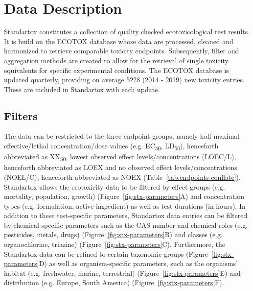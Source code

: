 \documentclass[journal,datadescriptor,submit,moreauthors,pdftex]{Definitions/mdpi}
\begin{document}
\section{Data Description}
Standartox constitutes a collection of quality checked ecotoxicological test results. It is build on the ECOTOX database \citep{usepa_ecotox_2019} whose data are processed, cleaned and harmonized to retrieve comparable toxicity endpoints. Subsequently, filter and aggregation methods are created to allow for the retrieval of single toxicity equivalents for specific experimental conditions. The ECOTOX database is updated quarterly, providing on average 5228 (2014 - 2019) new toxicity entries. These are included in Standartox with each update.

\subsection{Filters}
The data can be restricted to the three endpoint groups, namely half maximal effective/lethal concentration/dose values (e.g. EC\textsubscript{50}, LD\textsubscript{50}), henceforth abbreviated as XX\textsubscript{50}, lowest observed effect levels/concentrations (LOEC/L), henceforth abbreviated as LOEX and no observed effect levels/concentrations (NOEL/C), henceforth abbreviated as NOEX (Table~\ref{tab:endpoints-conflate}). Standartox allows the ecotoxicity data to be filtered by effect groups (e.g. mortality, population, growth) (Figure~\ref{fig:stx-parameters}A) and concentration types (e.g. formulation, active ingredient) as well as test durations (in hours). In addition to these test-specific parameters, Standartox data entries can be filtered by chemical-specific parameters such as the CAS number and chemical roles (e.g. pesticides, metals, drugs) (Figure~\ref{fig:stx-parameters}B) and classes (e.g. organochlorine, triazine) (Figure~\ref{fig:stx-parameters}C). Furthermore, the Standartox data can be refined to certain taxonomic groups (Figure~\ref{fig:stx-parameters}D) as well as organism-specific parameters, such as the organisms' habitat (e.g. freshwater, marine, terrestrial) (Figure~\ref{fig:stx-parameters}E) and distribution (e.g. Europe, South America) (Figure~\ref{fig:stx-parameters}F).
\end{document}
